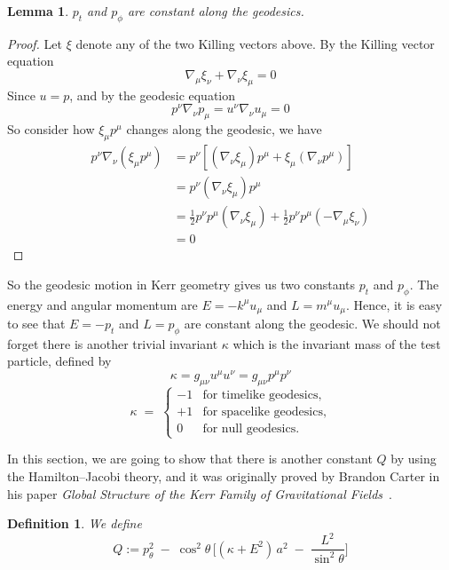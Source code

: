 \documentclass{article}
\newtheorem{definition}{Definition}[section]
\newtheorem{lemma}{Lemma}[section]
\theoremstyle{remark}
\begin{document}
\begin{lemma}
    $p_t$ and $p_{\phi}$ are constant along the geodesics.
\end{lemma}
\begin{proof}
    Let $\xi$ denote any of the two Killing vectors above. By the Killing vector equation 
    \begin{equation}
        \nabla_{\mu}\xi_{\nu}+\nabla_{\nu}\xi_{\mu}=0
    \end{equation}
    Since $u=p$, and by the geodesic equation
    \begin{equation}
        p^{\nu}\nabla_{\nu}p_{\mu}=u^{\nu}\nabla_{\nu}u_{\mu}=0
    \end{equation}
    So consider how $\xi_{\mu}p^{\mu}$ changes along the geodesic, we have
    \begin{align}
        p^{\nu}\nabla_{\nu}(\xi_{\mu}p^{\mu}) &= p^{\nu}[(\nabla_{\nu}\xi_{\mu})p^{\mu} + \xi_{\mu}(\nabla_{\nu}p^{\mu})]\\
        &= p^{\nu}(\nabla_{\nu}\xi_{\mu})p^{\mu}\\
        &= \frac{1}{2}p^{\nu}p^{\mu}(\nabla_{\nu}\xi_{\mu}) + \frac{1}{2}p^{\nu}p^{\mu}(-\nabla_{\mu}\xi_{\nu})\\
        &=0
    \end{align}
\end{proof}
So the geodesic motion in Kerr geometry gives us two constants $p_t$ and $p_{\phi}$. The energy and angular momentum are $E=-k^{\mu}u_{\mu}$ and $L=m^{\mu}u_{\mu}$. Hence, it is easy to see that $E=-p_t$ and $L=p_{\phi}$ are constant along the geodesic. We should not forget there is another trivial invariant $\kappa$ which is the invariant mass of the test particle, defined by 
\begin{equation}
    \kappa = g_{\mu\nu}u^{\mu}u^{\nu}=g_{\mu\nu}p^{\mu}p^{\nu}
\end{equation}
\[
\kappa \;=\;
\begin{cases}
-1 & \text{for timelike geodesics},\\[6pt]
+1 & \text{for spacelike geodesics},\\[6pt]
0  & \text{for null geodesics}.
\end{cases}
\]


In this section, we are going to show that there is another constant $Q$ by using the Hamilton--Jacobi theory, and it was originally proved by Brandon Carter in his paper \emph{Global Structure of the Kerr Family of Gravitational Fields}~\cite{carter}.

\begin{definition}\label{def:carter}
    We define
    \begin{equation}
        Q :=
    p_{\theta}^2
    \;-\;
    \cos^2 \theta \,
    \biggl[
    (\kappa + E^2)\,a^2
    \;-\;
    \frac{L^2}{\sin^2 \theta}
    \biggr]
    \end{equation}

\end{definition}
\end{document}

